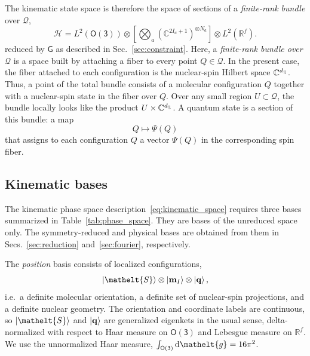 \documentclass[
  reprint,
  aps,
  prx,
  superscriptaddress,
  amsmath,
  amssymb,
  longbibliography
]{revtex4-2}
\newcommand{\eltfont}[1]{{\let\sigma\eltsigma\mathelt{#1}}}
\newcommand{\grp}[1]{\mathsf{#1}}
\newcommand{\elt}[1]{\eltfont{#1}}
\newcommand{\diff}{\mathrm{d}}
\newcommand{\gel}{\elt{g}}             %
\newcommand{\orient}{\elt{S}}          %
\newcommand{\spin}{\mathrel{\upharpoonleft}\kern-2pt\mathrel{\downharpoonright}}
\providecommand{\spin}{\mathrel{\upharpoonleft}\kern-2pt\mathrel{\downharpoonright}}
\providecommand{\Othree}{\grp{O(3)}}
\begin{document}
The kinematic state space is therefore the space of sections of a \emph{finite-rank bundle} over $\mathcal Q$,
\begin{equation}
\mathcal H
=
L^2\!\left(\Othree\right)
\otimes
\left[
\bigotimes_a
\left(\mathbb C^{2I_a+1}\right)^{\otimes N_a}
\right]
\otimes
L^2\!\left(\mathbb R^f\right).
\label{eq:kinematic_space}
\end{equation}
reduced by $\grp{G}$ as described in Sec.~\ref{sec:constraint}. Here, a \emph{finite-rank bundle over \(\mathcal Q\)} is a space built by attaching a fiber to every point $Q\in\mathcal Q$. In the present case, the fiber attached to each configuration is the nuclear-spin Hilbert space $\mathbb C^{d_{\spin}}$. Thus, a point of the total bundle consists of a molecular configuration $Q$ together with a nuclear-spin state in the fiber over $Q$. Over any small region $U\subset\mathcal Q$, the bundle locally looks like the product $U\times\mathbb C^{d_{\spin}}$. A quantum state is a section of this bundle: a map
\[
Q\longmapsto\Psi(Q)
\]
that assigns to each configuration $Q$ a vector $\Psi(Q)$ in the corresponding spin fiber.





\subsection{Kinematic bases}
\label{sec:bases_kin}

The kinematic phase space description~\eqref{eq:kinematic_space} requires three bases summarized in Table~\ref{tab:phase_space}. They are bases of the unreduced space only. The symmetry-reduced and physical bases are obtained from them in Secs.~\ref{sec:reduction} and~\ref{sec:fourier}, respectively. 

The \emph{position} basis consists of localized configurations,
\begin{equation}
\ket{\orient}\otimes\ket{\mathbf m_{I}}\otimes\ket{\mathbf q},
\label{eq:position_basis}
\end{equation}
i.e.\ a definite molecular orientation, a definite set of nuclear-spin projections, and a definite nuclear geometry. The orientation and coordinate labels are continuous, so $\ket{\orient}$ and $\ket{\mathbf q}$ are generalized eigenkets in the usual sense, delta-normalized with respect to Haar measure on $\grp{O(3)}$ and Lebesgue measure on $\mathbb R^f$. We use the unnormalized Haar measure, $\int_{\grp{O(3)}}\diff\gel=16\pi^2$.
\end{document}
